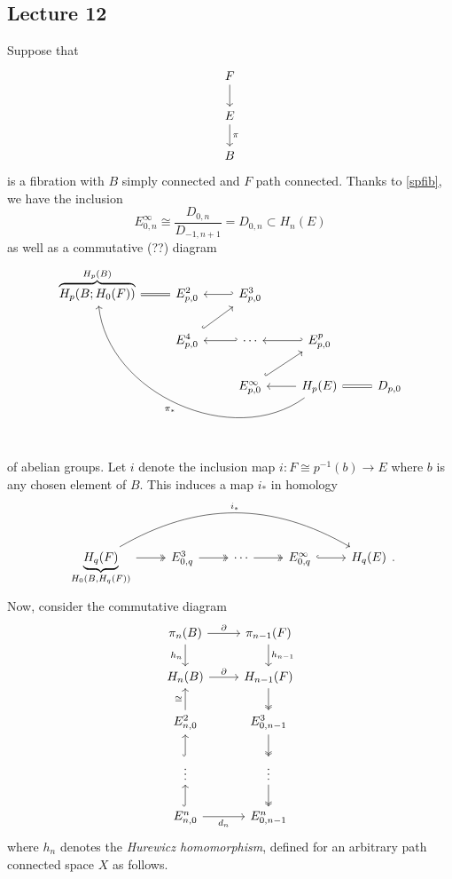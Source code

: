 \documentclass[10pt,letterpaper,cm]{nupset}
\theoremstyle{definition}
\theoremstyle{theorem}
\theoremstyle{remark}
\newcommand{\1}{\mathbb{1}}
\newcommand{\0}{\vec 0}
\begin{document}
\subsection{Lecture 12}
Suppose that
\[
\begin{tikzcd}
F \arrow[d]        \\
E \arrow[d, "\pi"] \\
B                 
\end{tikzcd}
\]
is a fibration with $B$ simply connected and $F$ path connected. Thanks to \cref{spfib}, we have the inclusion $$E_{0,n}^{\infty} \cong \frac{D_{0,n}}{D_{{-1}, n+1}} =D_{0,n}  \subset H_n(E)$$ as well as a commutative (??) diagram
\[
\begin{tikzcd}
\overbrace{H_p(B; H_0(F))}^{H_p(B)} \arrow[r, equals] & {E_{p,0}^2}                  & {E_{p,0}^3} \arrow[l, hook']        &                                                                      &           \\
                                              & {E_{p,0}^4} \arrow[ru, hook] & \cdots \arrow[l, hook']             & {E_{p,0}^p} \arrow[l, hook']                                         &           \\
                                              &                              & {E_{p,0}^{\infty}} \arrow[ru, hook] & H_p(E) \arrow[l] \arrow[r, equals] \arrow[llluu, "\pi_{\ast}", bend left=60] & {D_{p,0}}
\end{tikzcd}
\] of abelian groups.
Let $i$ denote the inclusion map $i : F \cong p^{-1}(b) \to E$ where $b$ is any chosen element of $B$. This induces a map $i_{\ast}$ in homology 
\[
\begin{tikzcd}
{\underbrace{H_q(F)}_{H_0(B, H_q(F))}} \arrow[r, two heads] \arrow[rrrr, "i_{\ast}", bend left] & {E^3_{0,q}} \arrow[r, two heads] & \cdots \arrow[r, two heads] & {E_{0,q}^{\infty}} \arrow[r, hook] & H_q(E)
\end{tikzcd}.
\]
Now, consider the commutative diagram
\[
\begin{tikzcd}
\pi_n(B) \arrow[d, "h_n"'] \arrow[r, "\partial"] & \pi_{n-1}(F) \arrow[d, "h_{n-1}"]  \\
H_n(B) \arrow[r, "\partial"]                     & H_{n-1}(F) \arrow[d, two heads]    \\
{E_{n,0}^2} \arrow[u, "\cong"]                   & {E_{0,n-1}^3} \arrow[d, two heads] \\
\vdots \arrow[u, hook]                           & \vdots \arrow[d, two heads]        \\
{E^n_{n,0}} \arrow[r, "d_n"'] \arrow[u, hook]    & {E_{0,n-1}^{n}}                   
\end{tikzcd}
\] where $h_n$ denotes the \textit{Hurewicz homomorphism}, defined for an arbitrary path connected space $X$ as follows. 
\end{document}
